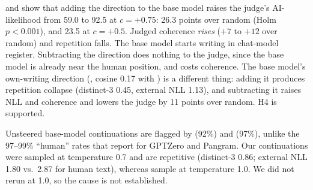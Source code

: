  and  show that adding the direction to the base model raises the judge's AI-likelihood from 59.0 to 92.5 at $c=+0.75$: 26.3 points over random (Holm $p<0.001$), and 23.5 at $c=+0.5$.
Judged coherence {\em rises} ($+7$ to $+12$ over random) and repetition falls.
The base model starts writing in chat-model register.
Subtracting the direction does nothing to the judge, since the base model is already near the human position, and costs coherence.
The base model's own-writing direction (\writeraw, cosine 0.17 with \airead) is a different thing: adding it produces repetition collapse (distinct-3 0.45, external NLL 1.13), and subtracting it raises NLL and coherence and lowers the judge by 11 points over random.
H4 is supported.

Unsteered base-model continuations are flagged by \desklib (92\%) and \bino (97\%), unlike the 97--99\% ``human'' rates that \citet{xu2026base} report for GPTZero and Pangram.
Our continuations were sampled at temperature 0.7 and are repetitive (distinct-3 0.86; external NLL 1.80 vs.\ 2.87 for human text), whereas \citet{xu2026base} sample at temperature 1.0.
We did not rerun at 1.0, so the cause is not established.
